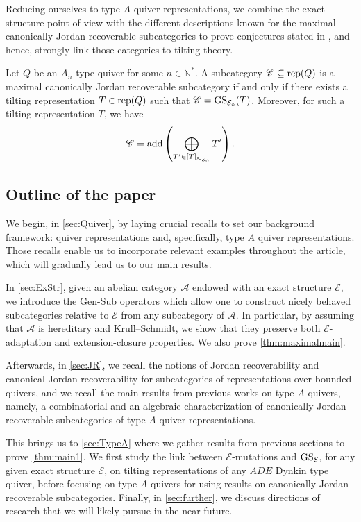 Reducing ourselves to type $A$ quiver representations, we combine the exact structure point of view with the different descriptions known for the maximal canonically Jordan recoverable subcategories to prove conjectures stated in \cite{D23}, and hence, strongly link those categories to tilting theory. 

\begin{theorem} \label{thm:main1}
    Let $Q$ be an $A_n$ type quiver for some $n \in \mathbb{N}^*$. A subcategory $\mathscr{C} \subseteq \operatorname{rep}(Q)$ is a maximal canonically Jordan recoverable subcategory if and only if there exists a tilting representation $T \in \operatorname{rep}(Q)$ such that $\mathscr{C} = \operatorname{GS}_{\mathcal{E}_\diamond}(T)$. Moreover, for such a tilting representation $T$, we have \[\mathscr{C} = \operatorname{add} \left(\bigoplus_{T' \in [T]_{\approx_{\mathcal{E}_\diamond}}} T'\right).\]
\end{theorem}

\subsection{Outline of the paper}
\label{ss:Outline} We begin, in \cref{sec:Quiver}, by laying crucial recalls to set our background framework: quiver representations and, specifically, type $A$ quiver representations. Those recalls enable us to incorporate relevant examples throughout the article, which will gradually lead us to our main results.

In \cref{sec:ExStr}, given an abelian category $\mathscr{A}$ endowed with an exact structure $\mathcal{E}$, we introduce the Gen-Sub operators which allow one to construct nicely behaved subcategories relative to $\mathcal{E}$ from any subcategory of $\mathscr{A}$. In particular, by assuming that $\mathscr{A}$ is hereditary and Krull--Schmidt, we show that they preserve both $\mathcal{E}$-adaptation and extension-closure properties. We also prove \cref{thm:maximalmain}.

Afterwards, in \cref{sec:JR}, we recall the notions of Jordan recoverability and canonical Jordan recoverability for subcategories of representations over bounded quivers, and we recall the main results from previous works on type $A$ quivers, namely, a combinatorial and an algebraic characterization of canonically Jordan recoverable subcategories of type $A$ quiver representations.

This brings us to \cref{sec:TypeA} where we gather results from previous sections to prove \cref{thm:main1}. We first study the link between $\mathcal{E}$-mutations and $\operatorname{GS}_\mathcal{E}$, for any given exact structure $\mathcal{E}$, on tilting representations of any $ADE$ Dynkin type quiver, before focusing on type $A$ quivers for using results on canonically Jordan recoverable subcategories. Finally, in \cref{sec:further}, we discuss directions of research that we will likely pursue in the near future.